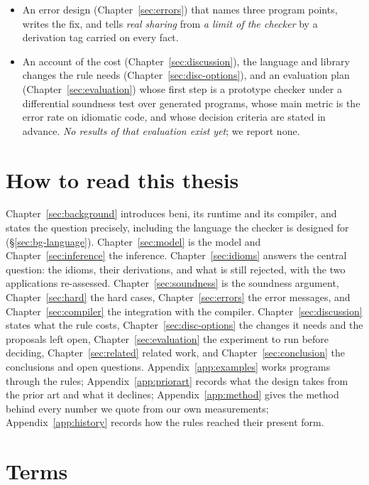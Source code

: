 \begin{itemize}
write sets provide it, and a treatment of the hard cases (Chapter~\ref{sec:hard}).
\item An error design (Chapter~\ref{sec:errors}) that names three program points, writes the fix, and
tells \emph{real sharing} from \emph{a limit of the checker} by a derivation tag carried on every fact.
\item An account of the cost (Chapter~\ref{sec:discussion}), the language and library changes the
rule needs (Chapter~\ref{sec:disc-options}), and an evaluation plan (Chapter~\ref{sec:evaluation})
whose first step is a prototype checker under a differential soundness test over generated programs, whose
main metric is the error rate on idiomatic code, and
whose decision criteria are stated in advance. \emph{No results of that evaluation exist yet}; we
report none.
\end{itemize}

\section{How to read this thesis}

Chapter~\ref{sec:background} introduces beni, its runtime and its compiler, and states the question
precisely, including the language the checker is designed for (\S\ref{sec:bg-language}).
Chapter~\ref{sec:model} is the model and Chapter~\ref{sec:inference} the inference.
Chapter~\ref{sec:idioms} answers the central question: the idioms, their derivations, and what is
still rejected, with the two applications re-assessed. Chapter~\ref{sec:soundness} is the soundness
argument, Chapter~\ref{sec:hard} the hard cases, Chapter~\ref{sec:errors} the error messages, and
Chapter~\ref{sec:compiler} the integration with the compiler. Chapter~\ref{sec:discussion} states
what the rule costs, Chapter~\ref{sec:disc-options} the changes it needs and the proposals left open,
Chapter~\ref{sec:evaluation} the experiment to run before deciding, Chapter~\ref{sec:related} related
work, and Chapter~\ref{sec:conclusion} the conclusions and open questions.
Appendix~\ref{app:examples} works programs through the rules; Appendix~\ref{app:priorart} records
what the design takes from the prior art and what it declines; Appendix~\ref{app:method} gives the
method behind every number we quote from our own measurements; Appendix~\ref{app:history} records how
the rules reached their present form.

\section{Terms}
\label{sec:intro-terms}

